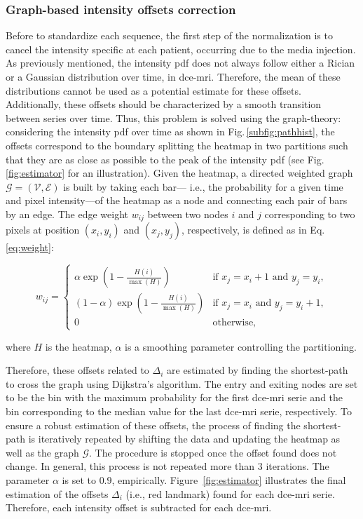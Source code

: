 \subsubsection{Graph-based intensity offsets correction}\label{sec:intoffsets}

Before to standardize each sequence, the first step of the normalization is to cancel the intensity specific at each patient, occurring due to the media injection.
As previously mentioned, the intensity \ac{pdf} does not always follow either a Rician or a Gaussian distribution over time, in \ac{dce}-\ac{mri}.
Therefore, the mean of these distributions cannot be used as a potential estimate for these offsets.
Additionally, these offsets should be characterized by a smooth transition between series over time.
Thus, this problem is solved using the graph-theory: considering the intensity \ac{pdf} over time as shown in Fig.\,\ref{subfig:pathhist}, the offsets correspond to the boundary splitting the heatmap in two partitions such that they are as close as possible to the peak of the intensity \ac{pdf} (see Fig.\,\ref{fig:estimator} for an illustration).
Given the heatmap, a directed weighted graph $\mathcal{G}=(\mathcal{V}, \mathcal{E})$ is built by taking each bar--- i.e., the probability for a given time and pixel intensity---of the heatmap as a node and connecting each pair of bars by an edge.
The edge weight $w_{ij}$ between two nodes $i$ and $j$ corresponding to two pixels at position $(x_i, y_i)$ and $(x_j, y_j)$, respectively, is defined as in Eq.\,\eqref{eq:weight}:

\begin{equation}
  w_{ij} = \begin{cases}
    \alpha \exp(1 - \frac{H(i)}{\max(H)})       & \text{if } x_j = x_i + 1 \text{ and } y_j = y_i, \\
    (1 - \alpha) \exp(1 - \frac{H(i)}{\max(H)}) & \text{if } x_j = x_i \text{ and } y_j = y_i + 1, \\
    0                                           & \text{otherwise},
  \end{cases}
  \label{eq:weight}
\end{equation}

\noindent where $H$ is the heatmap, $\alpha$ is a smoothing parameter controlling the partitioning.

Therefore, these offsets related to $\Delta_i$ are estimated by finding the shortest-path to cross the graph using Dijkstra's algorithm.
The entry and exiting nodes are set to be the bin with the maximum probability for the first \ac{dce}-\ac{mri} serie and the bin corresponding to the median value for the last \ac{dce}-\ac{mri} serie, respectively.
To ensure a robust estimation of these offsets, the process of finding the shortest-path is iteratively repeated by shifting the data and updating the heatmap as well as the graph $\mathcal{G}$.
The procedure is stopped once the offset found does not change.
In general, this process is not repeated more than 3 iterations.
The parameter $\alpha$ is set to $0.9$, empirically.
Figure~\ref{fig:estimator} illustrates the final estimation of the offsets $\Delta_i$ (i.e., red landmark) found for each \ac{dce}-\ac{mri} serie.
Therefore, each intensity offset is subtracted for each \ac{dce}-\ac{mri}.

